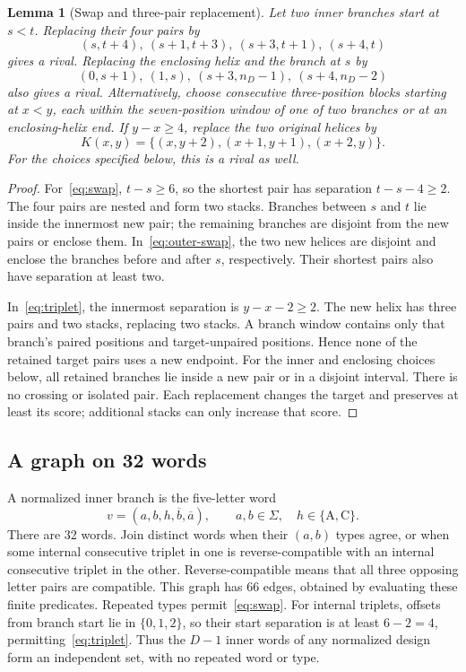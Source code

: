 \documentclass[11pt,a4paper]{article}
\newtheorem{lemma}[theorem]{Lemma}
\theoremstyle{definition}
\newcommand{\AC}{\{\mathrm A,\mathrm C\}}
\begin{document}
\begin{lemma}[Swap and three-pair replacement]\label{lem:replace}
Let two inner branches start at $s<t$.
Replacing their four pairs by
\begin{equation}\label{eq:swap}
 (s,t+4),\ (s+1,t+3),\ (s+3,t+1),\ (s+4,t)
\end{equation}
gives a rival. Replacing the enclosing helix and the branch at $s$ by
\begin{equation}\label{eq:outer-swap}
 (0,s+1),\ (1,s),\ (s+3,n_D-1),\ (s+4,n_D-2)
\end{equation}
also gives a rival.
Alternatively, choose consecutive three-position blocks starting at
$x<y$, each within the seven-position window of one of two branches
or at an enclosing-helix end. If $y-x\geq4$, replace the two original
helices by
\begin{equation}\label{eq:triplet}
 K(x,y)=\{(x,y+2),(x+1,y+1),(x+2,y)\}.
\end{equation}
For the choices specified below, this is a rival as well.
\end{lemma}
\begin{proof}
For~\eqref{eq:swap}, $t-s\geq6$, so the shortest pair has separation
$t-s-4\geq2$. The four pairs are nested and form two stacks.
Branches between $s$ and $t$ lie inside the innermost new pair;
the remaining branches are disjoint from the new pairs or enclose them.
In~\eqref{eq:outer-swap}, the two new helices are disjoint and enclose
the branches before and after $s$, respectively. Their shortest pairs
also have separation at least two.

In~\eqref{eq:triplet}, the innermost separation is $y-x-2\geq2$.
The new helix has three pairs and two stacks, replacing two stacks.
A branch window contains only that branch's paired positions and
target-unpaired positions. Hence none of the retained target pairs
uses a new endpoint. For the inner and enclosing choices below, all
retained branches lie inside a new pair or in a disjoint interval.
There is no crossing or isolated pair. Each replacement changes the
target and preserves at least its score; additional stacks can only
increase that score.
\end{proof}

\subsection{A graph on 32 words}
A normalized inner branch is the five-letter word
\[
 v=(a,b,h,\overline b,\overline a),\qquad a,b\in\Sigma,\quad h\in\AC.
\]
There are 32 words. Join distinct words when their $(a,b)$ types agree,
or when some internal consecutive triplet in one is reverse-compatible
with an internal consecutive triplet in the other. Reverse-compatible
means that all three opposing letter pairs are compatible.
This graph has 66 edges, obtained by evaluating these finite predicates.
Repeated types permit~\eqref{eq:swap}. For internal triplets, offsets
from branch start lie in $\{0,1,2\}$, so their start separation is at
least $6-2=4$, permitting~\eqref{eq:triplet}.
Thus the $D-1$ inner words of any normalized design form an independent
set, with no repeated word or type.
\end{document}
